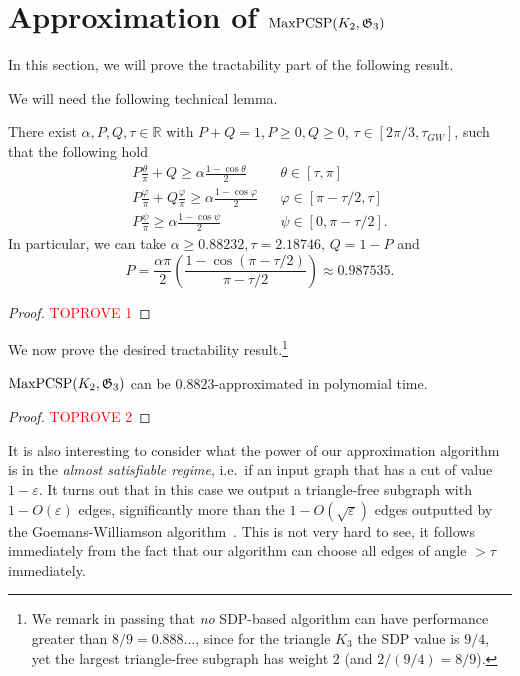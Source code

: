 \documentclass[a4paper,11pt, DIV=11]{scrartcl}
\renewcommand{\epsilon}{\varepsilon}
\renewcommand{\phi}{\varphi}
\renewcommand{\G}{\ensuremath{\mathfrak{G}}}
\DeclareMathOperator{\maxPCSP}{\textup{MaxPCSP}}
\renewcommand{\R}{\ensuremath{\mathbb{R}}}
\theoremstyle{plain}
\theoremstyle{definition}
\begin{document}
\section{\texorpdfstring{Approximation of $\maxPCSP(K_2, {\mathfrak{G}}_3)$}{Approximation of maxPCSP(K2,G3)}}
\label{sec:tractability}

In this section, we will prove the tractability part of the following result.

\main*

We will need the following technical lemma.

\begin{lemma}\label{lem:bounds}
    There exist $\alpha, P, Q, \tau \in \R$ with $P + Q = 1, P \geq 0, Q \geq 0$, $\tau \in [2 \pi / 3, \tau_{GW}]$, such that the following hold
\begin{align}
    P \frac{\theta}{\pi} + Q \geq \alpha \frac{1 - \cos\theta}{2} && \theta \in [\tau, \pi]\label{eq:cons1}\\
    P \frac{\phi}{\pi} + Q \frac{\phi}{\pi} \geq \alpha \frac{1 - \cos\phi}{2} && \phi \in [\pi - \tau/2, \tau]\label{eq:cons2}\\
    P \frac{\psi}{\pi} \geq \alpha \frac{1 - \cos \psi}{2} && \psi \in [0, \pi- \tau/2].\label{eq:cons3}
\end{align}
In particular, we can take $\alpha \geq 0.88232, \tau = 2.18746$, $Q = 1 - P$ and
\[
P = \frac{\alpha \pi}{2} \left(\frac{1 - \cos(\pi - \tau / 2)}{\pi - \tau / 2} \right) \approx 0.987535.
\]
\end{lemma}

\begin{proof}\textcolor{red}{TOPROVE 1}\end{proof}

We now prove the desired tractability result.\footnote{We remark in passing that \emph{no} SDP-based algorithm can have performance greater than $8/9 = 0.888\ldots$, since for the triangle $K_3$ the SDP value is $9/4$, yet the largest triangle-free subgraph has weight $2$ (and $2 / (9/4) = 8/9$).}

\begin{theorem}\label{thm:approx}
    $\maxPCSP(K_2, \G_3)$ can be $0.8823$-approximated in polynomial time.
\end{theorem}
\begin{proof}\textcolor{red}{TOPROVE 2}\end{proof}

It is also interesting to consider what the power of our approximation algorithm
is in the \emph{almost satisfiable regime}, i.e.~if an input graph that has a
cut of value $1 - \epsilon$. It turns out that in this case we output a
triangle-free subgraph with $1 - O(\epsilon)$ edges, significantly more than the
$1 - O(\sqrt{\epsilon})$ edges outputted by the Goemans-Williamson
algorithm~\cite{GW95}.
This is not very hard to see, it follows immediately from the fact that our algorithm can choose all edges of angle $> \tau$ immediately.
\end{document}
